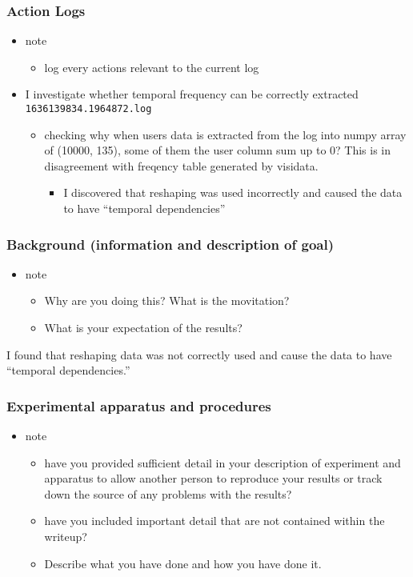 \documentclass[11pt]{article}
\begin{document}
\subsubsection{Action Logs}
\label{sec:org7547add}
\begin{itemize}
\item note
\begin{itemize}
\item log every actions relevant to the current log
\end{itemize}
\item I investigate whether temporal frequency can be correctly extracted \texttt{1636139834.1964872.log}
\begin{itemize}
\item checking why when users data is extracted from the log into numpy array of (10000, 135), some of them the user column sum up to 0? This is in disagreement with freqency table generated by visidata.
\begin{itemize}
\item I discovered that reshaping was used incorrectly and caused the data to have ``temporal dependencies''
\end{itemize}
\end{itemize}
\end{itemize}
\subsubsection{Background (information and description of goal)}
\label{sec:orgbe890af}
\begin{itemize}
\item note
\begin{itemize}
\item Why are you doing this? What is the movitation?
\item What is your expectation of the results?
\end{itemize}
\end{itemize}

I found that reshaping data was not correctly used and cause the data to have ``temporal dependencies.''

\subsubsection{Experimental apparatus and procedures}
\label{sec:org7e88619}
\begin{itemize}
\item note
\begin{itemize}
\item have you provided sufficient detail in your description of experiment and apparatus to allow another person to reproduce your results or track down the source of any problems with the results?
\item have you included important detail that are not contained within the writeup?
\item Describe what you have done and how you have done it.
\end{itemize}
\end{itemize}
\end{document}
